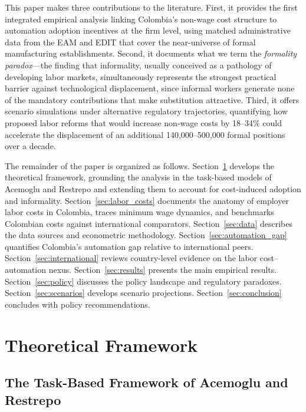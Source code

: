 \documentclass{article}
\begin{document}
This paper makes three contributions to the literature. First, it provides the first integrated empirical analysis linking Colombia's non-wage cost structure to automation adoption incentives at the firm level, using matched administrative data from the EAM and EDIT that cover the near-universe of formal manufacturing establishments. Second, it documents what we term the \textit{formality paradox}---the finding that informality, usually conceived as a pathology of developing labor markets, simultaneously represents the strongest practical barrier against technological displacement, since informal workers generate none of the mandatory contributions that make substitution attractive. Third, it offers scenario simulations under alternative regulatory trajectories, quantifying how proposed labor reforms that would increase non-wage costs by 18--34\% could accelerate the displacement of an additional 140,000--500,000 formal positions over a decade.

The remainder of the paper is organized as follows. Section~\ref{sec:theory} develops the theoretical framework, grounding the analysis in the task-based models of Acemoglu and Restrepo and extending them to account for cost-induced adoption and informality. Section~\ref{sec:labor_costs} documents the anatomy of employer labor costs in Colombia, traces minimum wage dynamics, and benchmarks Colombian costs against international comparators. Section~\ref{sec:data} describes the data sources and econometric methodology. Section~\ref{sec:automation_gap} quantifies Colombia's automation gap relative to international peers. Section~\ref{sec:international} reviews country-level evidence on the labor cost--automation nexus. Section~\ref{sec:results} presents the main empirical results. Section~\ref{sec:policy} discusses the policy landscape and regulatory paradoxes. Section~\ref{sec:scenarios} develops scenario projections. Section~\ref{sec:conclusion} concludes with policy recommendations.


\section{Theoretical Framework}
\label{sec:theory}

\subsection{The Task-Based Framework of Acemoglu and Restrepo}
\label{subsec:task_framework}
\end{document}
